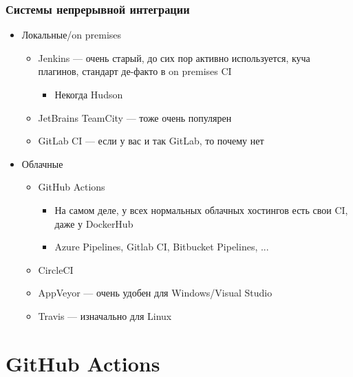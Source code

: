 \documentclass{../../slides-style}
\begin{document}
    \begin{frame}
        \frametitle{Системы непрерывной интеграции}
        \begin{itemize}
            \item Локальные/on premises
            \begin{itemize}
                \item Jenkins --- очень старый, до сих пор активно используется, куча плагинов, стандарт де-факто в on premises CI
                \begin{itemize}
                    \item Некогда Hudson
                \end{itemize}
                \item JetBrains TeamCity --- тоже очень популярен
                \item GitLab CI --- если у вас и так GitLab, то почему нет
            \end{itemize}
            \item Облачные
            \begin{itemize}
                \item GitHub Actions
                \begin{itemize}
                    \item На самом деле, у всех нормальных облачных хостингов есть свои CI, даже у DockerHub
                    \item Azure Pipelines, Gitlab CI, Bitbucket Pipelines, ...
                \end{itemize}
                \item CircleCI
                \item AppVeyor --- очень удобен для Windows/Visual Studio
                \item Travis --- изначально для Linux
            \end{itemize}
        \end{itemize}
    \end{frame}

    \section{GitHub Actions}
\end{document}
